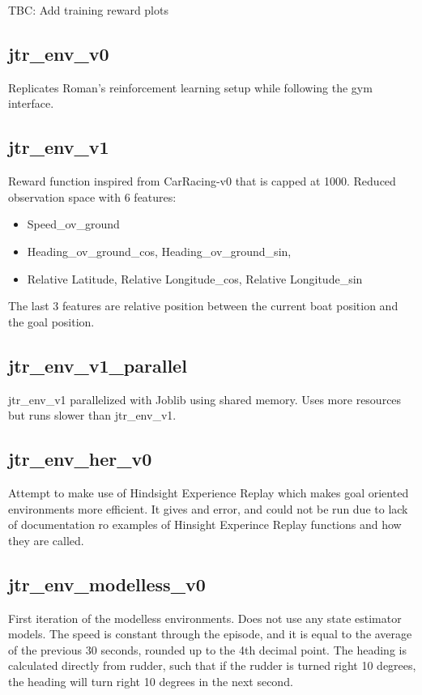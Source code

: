 TBC: Add training reward plots

\subsection*{jtr\_env\_v0}
Replicates Roman's reinforcement learning setup while following the gym interface.

\subsection*{jtr\_env\_v1}
Reward function inspired from CarRacing-v0 \cite{CarRacing-v0} that is capped at 1000.
Reduced observation space with 6 features: 
\begin{itemize}
    \item Speed\_ov\_ground
    \item Heading\_ov\_ground\_cos, Heading\_ov\_ground\_sin,
    \item  Relative Latitude, Relative Longitude\_cos, Relative Longitude\_sin
\end{itemize}
The last 3 features are relative position between the current boat position and the goal position.

\subsection*{jtr\_env\_v1\_parallel}
jtr\_env\_v1 parallelized with Joblib using shared memory. Uses more resources but runs slower than jtr\_env\_v1.

\subsection*{jtr\_env\_her\_v0}
Attempt to make use of Hindsight Experience Replay \cite{her-paper} which makes goal oriented environments more efficient. It gives and error, and could not be run due to lack of documentation ro examples of Hinsight Experince Replay functions and how they are called.

\subsection*{jtr\_env\_modelless\_v0}
First iteration of the modelless environments. Does not use any state estimator models. The speed is constant through the episode, and it is equal to the average of the previous 30 seconds, rounded up to the 4th decimal point. The heading is calculated directly from rudder, such that if the rudder is turned right 10 degrees, the heading will turn right 10 degrees in the next second.

